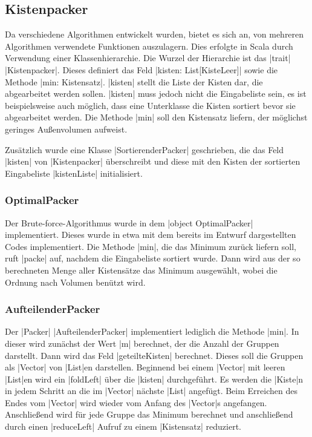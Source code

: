 \subsection{Kistenpacker}
Da verschiedene Algorithmen entwickelt wurden, bietet es sich an, von mehreren Algorithmen verwendete Funktionen auszulagern.
Dies erfolgte in Scala durch Verwendung einer Klassenhierarchie.
Die Wurzel der Hierarchie ist das |trait| |Kistenpacker|. Dieses definiert das Feld |kisten: List[KisteLeer]| sowie die Methode |min: Kistensatz|.
|kisten| stellt die Liste der Kisten dar, die abgearbeitet werden sollen.
|kisten| muss jedoch nicht die Eingabeliste sein, es ist beispielsweise auch möglich, dass eine Unterklasse die Kisten sortiert bevor sie abgearbeitet werden.
Die Methode |min| soll den Kistensatz liefern, der möglichst geringes Außenvolumen aufweist.

Zusätzlich wurde eine Klasse |SortierenderPacker| geschrieben,
  die das Feld |kisten| von |Kistenpacker| überschreibt und diese mit den Kisten der sortierten Eingabeliste |kistenListe| initialisiert.
\subsubsection{OptimalPacker}
Der Brute-force-Algorithmus wurde in dem |object OptimalPacker| implementiert.
Dieses wurde in etwa mit dem bereits im Entwurf dargestellten Codes implementiert.
Die Methode |min|, die das Minimum zurück liefern soll, ruft |packe| auf, nachdem die Eingabeliste sortiert wurde.
Dann wird aus der so berechneten Menge aller Kistensätze das Minimum ausgewählt, wobei die Ordnung nach Volumen benützt wird.
\subsubsection{AufteilenderPacker}
Der |Packer| |AufteilenderPacker| implementiert lediglich die Methode |min|.
In dieser wird zunächst der Wert |m| berechnet, der die Anzahl der Gruppen darstellt.
Dann wird das Feld |geteilteKisten| berechnet. Dieses soll die Gruppen als |Vector| von |List|en darstellen.
Beginnend bei einem |Vector| mit leeren |List|en wird ein |foldLeft| über die |kisten| durchgeführt.
Es werden die |Kiste|n in jedem Schritt an die im |Vector| nächste |List| angefügt.
Beim Erreichen des Endes vom |Vector| wird wieder vom Anfang des |Vector|s angefangen.
Anschließend wird für jede Gruppe das Minimum berechnet und anschließend durch einen |reduceLeft| Aufruf zu einem |Kistensatz| reduziert.
